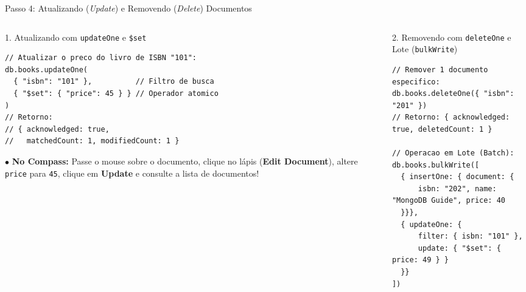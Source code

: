 \begin{frame}[fragile]{Passo 4: Atualizando (\textit{Update}) e Removendo (\textit{Delete}) Documentos}
  \vspace{0.05cm}
  \begin{columns}[t]
    \begin{column}{0.48\textwidth}
      \alert{1. Atualizando com \texttt{updateOne} e \texttt{\$set}}\par
      \begin{lstlisting}[language=mongosh]
// Atualizar o preco do livro de ISBN "101":
db.books.updateOne(
  { "isbn": "101" },          // Filtro de busca
  { "$set": { "price": 45 } } // Operador atomico
)
// Retorno:
// { acknowledged: true,
//   matchedCount: 1, modifiedCount: 1 }
      \end{lstlisting}
      \scriptsize
      $\bullet$ \textbf{No Compass:} Passe o mouse sobre o documento, clique no lápis (\textbf{Edit Document}), altere \texttt{price} para \texttt{45}, clique em \textbf{Update} e consulte a lista de documentos!
    \end{column}
    \begin{column}{0.48\textwidth}
      \alert{2. Removendo com \texttt{deleteOne} e Lote (\texttt{bulkWrite})}\par
      \begin{lstlisting}[language=mongosh]
// Remover 1 documento especifico:
db.books.deleteOne({ "isbn": "201" })
// Retorno: { acknowledged: true, deletedCount: 1 }

// Operacao em Lote (Batch):
db.books.bulkWrite([
  { insertOne: { document: {
      isbn: "202", name: "MongoDB Guide", price: 40
  }}},
  { updateOne: {
      filter: { isbn: "101" },
      update: { "$set": { price: 49 } }
  }}
])
      \end{lstlisting}
    \end{column}
  \end{columns}
\end{frame}
